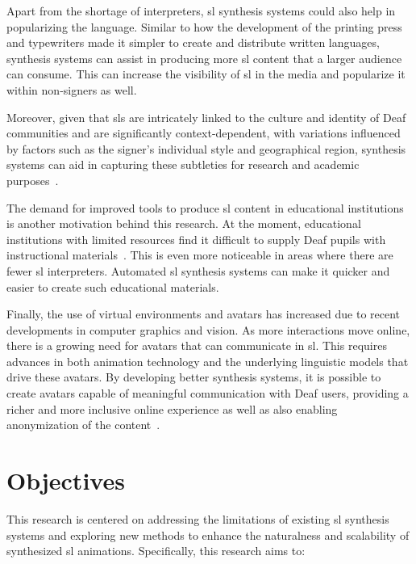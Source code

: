 \documentclass[../../main.tex]
{subfiles}
\begin{document}
Apart from the shortage of interpreters, \gls{sl} synthesis systems could also help in popularizing the language. Similar to how the development of the printing press and typewriters made it simpler to create and distribute written languages, synthesis systems can assist in producing more \gls{sl} content that a larger audience can consume. This can increase the visibility of \gls{sl} in the media and popularize it within non-signers as well.

Moreover, given that \gls{sl}s are intricately linked to the culture and identity of Deaf communities and are significantly context-dependent, with variations influenced by factors such as the signer's individual style and geographical region, synthesis systems can aid in capturing these subtleties for research and academic purposes~\cite{mti7100097}.

The demand for improved tools to produce \gls{sl} content in educational institutions is another motivation behind this research. At the moment, educational institutions with limited resources find it difficult to supply Deaf pupils with instructional materials~\cite{skutnabb2013linguistic}. This is even more noticeable in areas where there are fewer \gls{sl} interpreters. Automated \gls{sl} synthesis systems can make it quicker and easier to create such educational materials.

Finally, the use of virtual environments and avatars has increased due to recent developments in computer graphics and vision. As more interactions move online, there is a growing need for avatars that can communicate in \gls{sl}. This requires advances in both animation technology and the underlying linguistic models that drive these avatars. By developing better synthesis systems, it is possible to create avatars capable of meaningful communication with Deaf users, providing a richer and more inclusive online experience as well as also enabling anonymization of the content~\cite{xia2022sign}.

\section{Objectives}
\label{ch:introduction:objectives}

This research is centered on addressing the limitations of existing \gls{sl} synthesis systems and exploring new methods to enhance the naturalness and scalability of synthesized \gls{sl} animations. Specifically, this research aims to:
\end{document}
